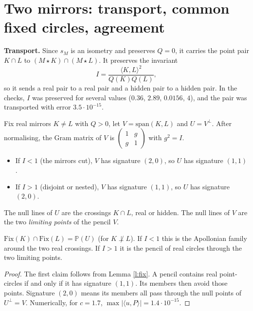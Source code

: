 \documentclass[10pt]{article}
\theoremstyle{definition}\newtheorem{definition}[theorem]{Definition}\newtheorem{remark}[theorem]{Remark}
\newcommand{\ip}[2]{\langle #1,#2\rangle}
\begin{document}
\section{Two mirrors: transport, common fixed circles, agreement}
\textbf{Transport.} Since $s_M$ is an isometry and preserves $Q=0$, it carries the point pair $K\cap L$ to $(M\star K)\cap(M\star L)$. It preserves the invariant
\[I=\frac{\ip KL^2}{Q(K)Q(L)},\]
so it sends a real pair to a real pair and a hidden pair to a hidden pair.
In the checks, $I$ was preserved for several values ($0.36$, $2.89$, $0.0156$, $4$), and the pair was transported with error $3.5\cdot10^{-15}$.

Fix real mirrors $K\neq L$ with $Q>0$, let $V=\mathrm{span}(K,L)$ and $U=V^\perp$. After normalising, the Gram matrix of $V$ is $\begin{pmatrix}1&g\\g&1\end{pmatrix}$ with $g^2=I$.
\begin{itemize}
\item If $I<1$ (the mirrors cut), $V$ has signature $(2,0)$, so $U$ has signature $(1,1)$.
\item If $I>1$ (disjoint or nested), $V$ has signature $(1,1)$, so $U$ has signature $(2,0)$.
\end{itemize}
The null lines of $U$ are the crossings $K\cap L$, real or hidden. The null lines of $V$ are the two \emph{limiting points} of the pencil $V$.

\begin{lemma}
$\mathrm{Fix}(K)\cap\mathrm{Fix}(L)=\mathbb P(U)$ (for $K\not\perp L$).
If $I<1$ this is the Apollonian family around the two real crossings.
If $I>1$ it is the pencil of real circles through the two limiting points.
\end{lemma}
\begin{proof}
The first claim follows from Lemma \ref{l:fix}. A pencil contains real point-circles if and only if it has signature $(1,1)$. Its members then avoid those points. Signature $(2,0)$ means its members all pass through the null points of $U^\perp=V$.
Numerically, for $c=1.7$, $\max|\ip uP|=1.4\cdot10^{-15}$.
\end{proof}
\end{document}
